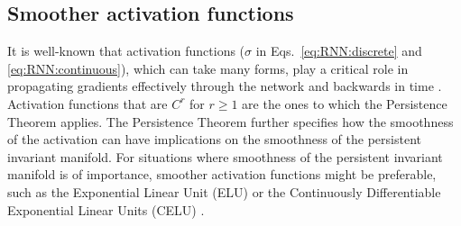 \documentclass{article} %
\newcounter{ct}
\theoremstyle{definition}
\theoremstyle{remark}
\begin{document}
\subsection{Smoother activation functions}
It is well-known that activation functions ($\sigma$ in  Eqs.~\ref{eq:RNN:discrete} and  \ref{eq:RNN:continuous}), which can take many forms, play a critical role in propagating gradients effectively through the network and backwards in time \citep{jagtap2023,ramachandran2017,hayou2019}.
Activation functions that are $C^r$ for $r\geq 1$ are the ones to which the Persistence Theorem applies. 
The Persistence Theorem further specifies how the smoothness of the activation can have implications on the smoothness of the persistent invariant manifold.
For situations where smoothness of the persistent invariant manifold is of importance, smoother activation functions might be preferable, such as the Exponential Linear Unit (ELU)\citep{clevert2015} or the Continuously Differentiable Exponential Linear Units (CELU) \citep{barron2017}.








\end{document}
